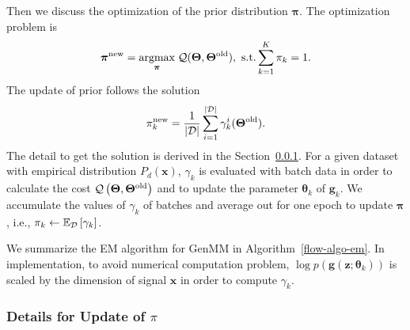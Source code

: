 Then we discuss the optimization of the prior distribution $\bm{\pi}$. The optimization problem is 
\begin{equation}\label{eq-pi-update1}
  \bm{\pi}^{\mathrm{new}} = \underset{\bm{\pi}}{\operatorname{argmax}}\;{ \mathcal{Q}
    (\bm{\Theta},\bm{\Theta}^{\mathrm{old}})}, \,\,
  \mathrm{s.t.} \sum_{k=1}^{K}\pi_k = 1.
\end{equation}
The update of prior follows the solution
\begin{equation}\label{eq-pi-solution}
  \pi_k^{\mathrm{new}} = \frac{1}{| \mathcal{D} |}\sum_{i=1}^{| \mathcal{D} |}\gamma_k^{i}(\bm{\Theta}^{\mathrm{old}}).
\end{equation}
The detail to get the solution is derived in the Section~\ref{subsubsec:Proof_for_update}. For a given dataset with empirical distribution $P_d(\bm{x})$,
$\gamma_k$ is evaluated with batch data in order to calculate the cost
$\mathcal{Q}\left(\bm{\Theta},\bm{\Theta}^{\mathrm{old}}\right)$ and to update the
parameter $\bm{\theta}_k$ of $\bm{g}_k$. We accumulate the values of $\gamma_k$ of batches and
average out for one epoch to update $\bm{\pi}$, {i.e.}, $\pi_k \gets \mathbb{E}_{\mathcal{D}}\left[ \gamma_k \right]$.



We summarize the EM algorithm for GenMM in Algorithm~\ref{flow-algo-em}.
In implementation, to avoid numerical computation problem, $\log{p(\bm{g}(\bm{z}; \bm{\theta}_k))}$ is
scaled by the dimension of signal $\bm{x}$ in order to compute $\gamma_k$. 

\subsubsection{Details for Update of $\pi$}
\label{subsubsec:Proof_for_update}


